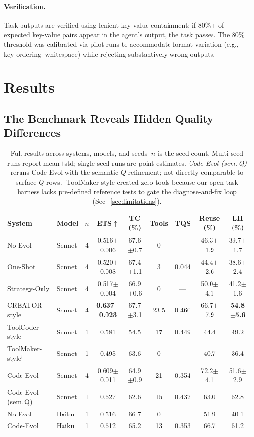 \documentclass[sigconf,anonymous,review,natbib=false]{acmart}
\begin{document}
\paragraph{Verification.} Task outputs are verified using lenient key-value containment: if 80\%+ of expected key-value pairs appear in the agent's output, the task passes. The 80\% threshold was calibrated via pilot runs to accommodate format variation (e.g., key ordering, whitespace) while rejecting substantively wrong outputs.

\section{Results}
\label{sec:results}

\subsection{The Benchmark Reveals Hidden Quality Differences}

\begin{table}[t]
\centering\small
\begin{tabular}{llccccccc}
\toprule
\textbf{System} & \textbf{Model} & $n$ & \textbf{ETS}$\uparrow$ & \textbf{TC (\%)} & \textbf{Tools} & \textbf{TQS} & \textbf{Reuse (\%)} & \textbf{LH (\%)} \\
\midrule
No-Evol & Sonnet & 4 & 0.516$\pm$0.006 & 67.6$\pm$0.7 & 0 & --- & 46.3$\pm$1.9 & 39.7$\pm$1.7 \\
One-Shot & Sonnet & 4 & 0.520$\pm$0.008 & 67.4$\pm$1.1 & 3 & 0.044 & 44.4$\pm$2.6 & 38.6$\pm$2.4 \\
Strategy-Only & Sonnet & 4 & 0.517$\pm$0.004 & 66.9$\pm$0.6 & 0 & --- & 50.0$\pm$4.1 & 41.2$\pm$1.6 \\
CREATOR-style & Sonnet & 4 & \textbf{0.637$\pm$0.023} & 67.7$\pm$3.1 & 23.5 & 0.460 & 66.7$\pm$7.9 & \textbf{54.8$\pm$5.6} \\
ToolCoder-style & Sonnet & 1 & 0.581 & 54.5 & 17 & 0.449 & 44.4 & 49.2 \\
ToolMaker-style$^\dagger$ & Sonnet & 1 & 0.495 & 63.6 & 0 & --- & 40.7 & 36.4 \\
Code-Evol & Sonnet & 4 & 0.609$\pm$0.011 & 64.9$\pm$0.9 & 21 & 0.354 & 72.2$\pm$4.1 & 51.6$\pm$2.9 \\
Code-Evol (sem.\,Q) & Sonnet & 1 & 0.627 & 62.6 & 15 & 0.432 & 63.0 & 52.8 \\
\midrule
No-Evol & Haiku & 1 & 0.516 & 66.7 & 0 & --- & 51.9 & 40.1 \\
Code-Evol & Haiku & 1 & 0.612 & 65.2 & 13 & 0.353 & 66.7 & 51.2 \\
\bottomrule
\end{tabular}
\caption{Full results across systems, models, and seeds. $n$ is the seed count. Multi-seed runs report mean$\pm$std; single-seed runs are point estimates. \emph{Code-Evol (sem.\,Q)} reruns Code-Evol with the semantic $Q$ refinement; not directly comparable to surface-$Q$ rows. $^\dagger$ToolMaker-style created zero tools because our open-task harness lacks pre-defined reference tests to gate the diagnose-and-fix loop (Sec.~\ref{sec:limitations}).}
\label{tab:results}
\end{table}
\end{document}
